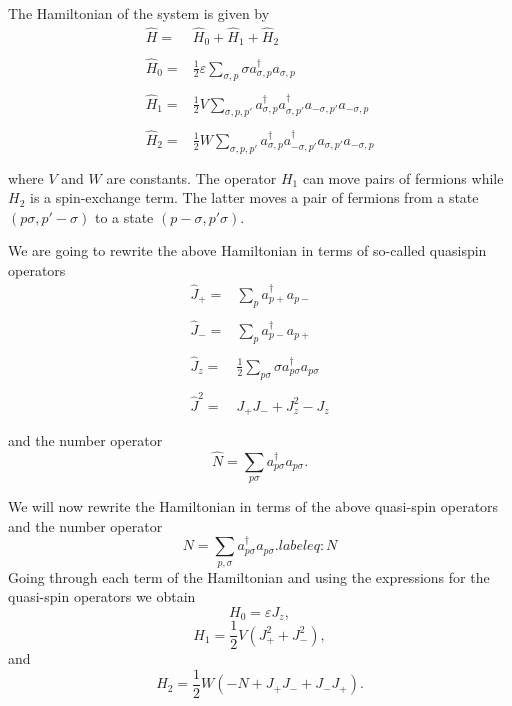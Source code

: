 \documentclass[twocolumn,superscriptaddress,unsortedaddress,nofootinbib,amsmath,amssymb,
aps,floatfix]{revtex4-2}
\begin{document}
The Hamiltonian of the system is given by
\[
\begin{array}{ll}
\hat{H}=&\hat{H}_{0}+\hat{H}_{1}+\hat{H}_{2}\\
&\\
\hat{H}_{0}=&\frac{1}{2}\varepsilon\sum_{\sigma ,p}\sigma
a_{\sigma,p}^{\dagger}a_{\sigma ,p}\\
&\\
\hat{H}_{1}=&\frac{1}{2}V\sum_{\sigma ,p,p'}
a_{\sigma,p}^{\dagger}a_{\sigma ,p'}^{\dagger}
a_{-\sigma ,p'}a_{-\sigma ,p}\\
&\\
\hat{H}_{2}=&\frac{1}{2}W\sum_{\sigma ,p,p'}
a_{\sigma,p}^{\dagger}a_{-\sigma ,p'}^{\dagger}
a_{\sigma ,p'}a_{-\sigma ,p}\\
&\\
\end{array}
\]
where $V$ and $W$ are constants. The operator 
$H_{1}$ can move pairs of fermions
while $H_{2}$ is a spin-exchange term. The latter
moves a pair of fermions from a state $(p\sigma ,p' -\sigma)$ to a state
$(p-\sigma ,p'\sigma)$.

We are going to rewrite the above Hamiltonian in terms of so-called  quasispin operators
\[
\begin{array}{ll}
\hat{J}_{+}=&\sum_{p}
a_{p+}^{\dagger}a_{p-}\\
&\\
\hat{J}_{-}=&\sum_{p}
a_{p-}^{\dagger}a_{p+}\\
&\\
\hat{J}_{z}=&\frac{1}{2}\sum_{p\sigma}\sigma
a_{p\sigma}^{\dagger}a_{p\sigma}\\
&\\
\hat{J}^{2}=&J_{+}J_{-}+J_{z}^{2}-J_{z}\\
&\\
\end{array}
\]
and the number operator 
\[
\hat{N}=\sum_{p\sigma}
a_{p\sigma}^{\dagger}a_{p\sigma}.
\]

We will now rewrite the Hamiltonian in terms of the above quasi-spin operators and the number operator 
\begin{equation}
N = \sum_{p,\sigma} a_{p\sigma}^\dagger a_{p\sigma}.
label{eq:N}
\end{equation}
Going through each term of the Hamiltonian and using the expressions for the quasi-spin operators we obtain
\begin{equation}
H_0 = \varepsilon J_z, 
\end{equation}
\begin{equation}
H_1 = \frac{1}{2} V \left( J_+^2 + J_-^2 \right),
\end{equation}
and 
\begin{equation}
H_2 = \frac{1}{2} W \left( -N + J_+ J_- + J_- J_+ \right).
\end{equation}
\end{document}
